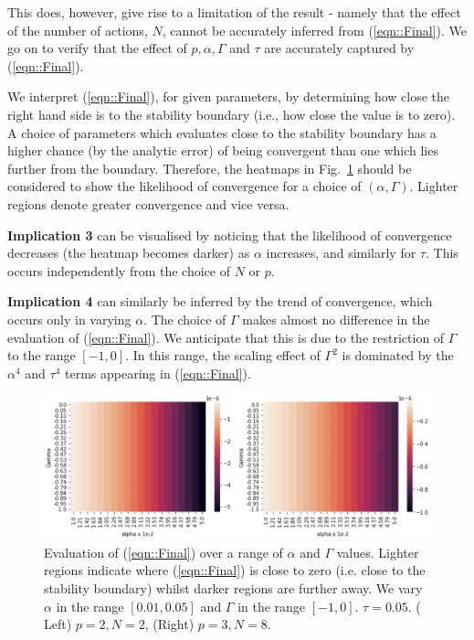 \documentclass{article}
\begin{document}
This does,
however, give rise to a limitation of the result - namely that the
effect of the number of actions, $N$, cannot be accurately inferred from
 (\ref{eqn::Final}). We go on to verify that
the effect of $p, \alpha, \Gamma$ and $\tau$ are accurately captured
by (\ref{eqn::Final}).

We interpret (\ref{eqn::Final}), for given parameters, by determining
how close the right hand side is to the stability boundary (i.e., how
close the value is to zero). A choice of parameters which evaluates
close to the stability boundary has a higher chance (by the analytic
error) of being convergent than one which lies further from the
boundary. Therefore, the heatmaps in Fig.~\ref{fig:theory} should
be considered to show the likelihood of convergence for a choice of
$(\alpha, \Gamma)$. Lighter regions denote greater
convergence and vice versa.

\textbf{Implication 3} can be visualised by noticing that the likelihood of convergence decreases (the heatmap becomes darker) as $\alpha$ increases, and similarly for $\tau$. This occurs independently from the choice of $N$ or $p$. 

\textbf{Implication 4} can similarly be inferred by the trend of convergence, which occurs only in varying $\alpha$. The choice of $\Gamma$
makes almost no difference in the evaluation of (\ref{eqn::Final}). We
anticipate that this is due to the restriction of $\Gamma$ to
the range $[-1, 0]$. In this range, the scaling effect of $\Gamma^2$
is dominated by the $\alpha^4$ and $\tau^4$ terms appearing in
(\ref{eqn::Final}).

\begin{figure}[t]
    \includegraphics[width = 1.2 \linewidth, center]{Figures/Theory.png}
    \caption{Evaluation of (\ref{eqn::Final}) over a range of $\alpha$ and $\Gamma$ values. Lighter regions indicate where (\ref{eqn::Final}) is close to zero (i.e. close to the stability boundary) whilst darker regions are further away. We vary $\alpha$ in the range $[0.01, 0.05]$ and $\Gamma$ in the range $[-1, 0]$. $\tau = 0.05$. ( Left) $p = 2, N = 2$, (Right) $p = 3, N = 8$.}
    \label{fig:theory}
\end{figure}
\end{document}

